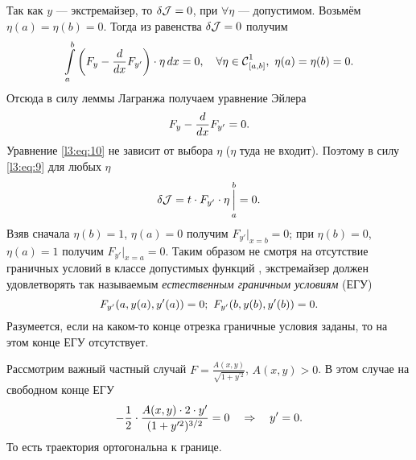 Так как $y$ --- экстремайзер, то $\delta\mathcal{J}=0$, при $\forall\eta$ --- допустимом. Возьмём $\eta(a)=\eta(b)=0$. Тогда из равенства $\delta\mathcal{J}=0$ получим 
\begin{equation*}
	\hfill\int\limits_a^b\left(F_y-\der{}{x}F_{y'}\right)\cdot\eta\,dx=0,\quad \forall\eta\in\Cfn[{[a,b]}]{1},\ \eta(a)=\eta(b)=0.\hfill
\end{equation*}
Отсюда в силу леммы Лагранжа получаем уравнение Эйлера
\begin{equation}
	\label{l3:eq:10}
	\hfill F_{y}-\der{}{x}F_{y'}=0.\hfill
\end{equation}
Уравнение \eqref{l3:eq:10} не зависит от выбора $\eta$ ($\eta$  туда не входит). Поэтому в силу \eqref{l3:eq:9} для любых $\eta$
\begin{equation*}
	\hfill\delta\J=t\cdot F_{y'}\cdot\eta\mathop{\Big|}\limits_a^b=0.\hfill
\end{equation*}
Взяв сначала $\eta(b)=1$, $\eta(a)=0$ получим $F_{y'}\big|_{x=b}=0$; при $\eta(b)=0$, $\eta(a)=1$ получим $F_{y'}\big|_{x=a}=0$. Таким образом не смотря на отсутствие граничных условий в классе допустимых функций \K, экстремайзер должен удовлетворять так называемым \emph{естественным граничным условиям} (ЕГУ)
\vspace{-0.4cm}
\begin{equation}
	\label{l3:eq:11}
	\hfill F_{y'}(a,y(a),y'(a))=0;\ F_{y'}(b,y(b),y'(b))=0.\hfill
\end{equation}  
Разумеется, если на каком-то конце отрезка граничные условия заданы, то на этом конце ЕГУ отсутствует.

Рассмотрим важный частный случай $F=\displaystyle\frac{A(x,y)}{\sqrt{1+y^{\prime 2}}}$, $A(x,y)>0$. В этом случае на свободном конце ЕГУ
\begin{equation*}
	\hfill-\frac12\cdot\frac{A(x,y)\cdot2\cdot y'}{(1+y^{\prime2})^{3/2}}=0\quad\Rightarrow\quad y'=0.\hfill
\end{equation*} 
То есть траектория ортогональна к границе.

